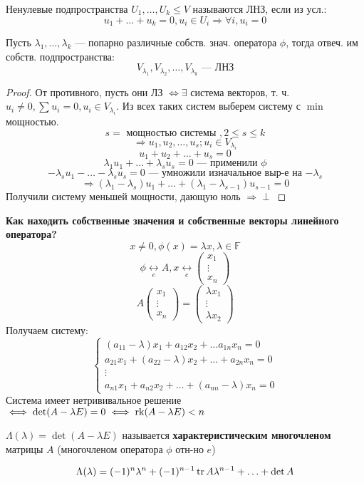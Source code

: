\begin{definition}
  Ненулевые подпространства $U_1, \ldots, U_k \leq V$ называются ЛНЗ, если из усл.:
  \[
  u_1 + \ldots + u_k = 0, u_i \in U_i \Rightarrow \forall i, u_i = 0
  \]
\end{definition}
\begin{theorem}
\label{theorem:03_3}
Пусть $\lambda_1, \ldots, \lambda_k$ --- попарно различные собств. знач. оператора $\phi$, тогда отвеч. им собств. подпространства:
\[
  V_{\lambda_1}, V_{\lambda_2}, \ldots, V_{\lambda_k} \text{ --- ЛНЗ}
\]
\end{theorem}
\begin{proof}
  От противного, пусть они ЛЗ $\iff \exists $ система векторов, т. ч. $u_i \neq 0, \sum_{}^{} u_i = 0, u_i \in V_{\lambda_i}$. Из всех таких систем выберем систему с $\min$ мощностью.
  \[
  s = \text{ мощностью системы }, 2 \leq s \leq k
  \]
  \[
  \Rightarrow u_1, u_2, \ldots, u_s; u_i \in V_{\lambda_i}
  \]
  \[
  u_1 + u_2 + \ldots + u_s = 0
  \]
  \[
  \lambda_1 u_1 + \ldots + \lambda_s u_s = 0 \text{ --- применили $\phi$}
  \]
  \[
  -\lambda_s u_1 - \ldots - \lambda_s u_s = 0 \text{ --- умножили изначальное выр-е на $-\lambda_s$} 
  \]
  \[
  \Rightarrow (\lambda_1 - \lambda_s) u_1 + \ldots + (\lambda_1 - \lambda_{s - 1})u_{s - 1} = 0
  \]
  Получили систему меньшей мощности, дающую ноль $\Rightarrow \perp$
\end{proof}
\textbf{Как находить собственные значения и собственные векторы линейного оператора?}
\[
x \neq 0, \phi(x) = \lambda x, \lambda \in \mathbb{F}
\]
\[
\phi \underset{e}{\longleftrightarrow} A, x \underset{e}{\longleftrightarrow} \begin{pmatrix}x_1 \\ \vdots \\ x_n \end{pmatrix}
\]
\[
A\begin{pmatrix}x_1 \\ \vdots \\ x_n \end{pmatrix} = \begin{pmatrix} \lambda x_1 \\ \vdots \\ \lambda x_2 \end{pmatrix}
\]
Получаем систему:
\begin{equation}
  \label{equation:03_1}
\begin{cases}
  (a_{11} - \lambda) x_1 + a_{12}x_2 + \ldots a_{1n} x_n = 0 \\
  a_{21} x_1 + (a_{22} - \lambda) x_2 + \ldots + a_{2n} x_n = 0 \\
  \vdots \\
  a_{n 1} x_1 + a_{n 2} x_2 + \ldots + (a_{n n} - \lambda) x_n = 0
\end{cases}
\end{equation}
Система имеет нетрививальное решение $\iff \det (A - \lambda E) = 0 \iff \operatorname{rk} (A - \lambda E) < n$

\begin{definition}
  $\Lambda(\lambda) = \det (A - \lambda E)$ называется \textbf{характеристическим многочленом} матрицы $A$ (многочленом оператора $\phi$ отн-но $e$)
\end{definition}
\[
\Lambda(\lambda) = (-1)^{n} \lambda^{n} + (-1)^{n - 1} \operatorname{tr} A \lambda^{n - 1} + \ldots + \det A
\]
